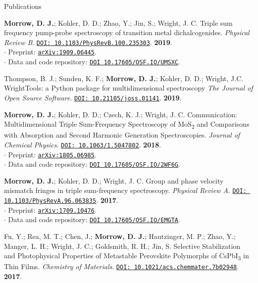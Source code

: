 \documentclass{resume} %
\begin{document}
\begin{rSection}{Publications}
\begin{etaremune}
\item  \textbf{Morrow, D. J.}; Kohler, D. D.; Zhao, Y.; Jin, S.; Wright, J. C. Triple sum frequency pump-probe spectroscopy of transition metal dichalcogenides. \emph{Physical Review B}. \href{https://journals.aps.org/prb/abstract/10.1103/PhysRevB.100.235303}{\texttt{DOI: 10.1103/PhysRevB.100.235303}}. \textbf{2019}.\\
$\cdot$ Preprint: \href{http://arxiv.org/abs/1909.06445}{\texttt{arXiv:1909.06445}}. \\
$\cdot$ Data and code repository: \href{https://osf.io/UMSXC/}{\texttt{DOI 10.17605/OSF.IO/UMSXC}}.

\item Thompson, B. J.; Sunden, K. F.; \textbf{Morrow, D. J.}; Kohler, D. D.; Wright, J.C. 
WrightTools: a Python package for multidimensional spectroscopy \emph{The Journal of Open Source Software}. 
\href{http://doi.org/10.21105/joss.01141}{\texttt{DOI: 10.21105/joss.01141}}. \textbf{2019}.
	
\item \textbf{Morrow, D. J.}; Kohler, D. D.; Czech, K. J.; Wright, J. C. 
Communication: Multidimensional Triple Sum-Frequency Spectroscopy of MoS\textsubscript{2} and Comparisons with Absorption and Second Harmonic Generation Spectroscopies. \emph{Journal of Chemical Physics}. \href{http://doi.org/10.1063/1.5047802}{\texttt{DOI: 10.1063/1.5047802}}. \textbf{2018}.\\
$\cdot$ Preprint: \href{http://arxiv.org/abs/1805.06985}{\texttt{arXiv:1805.06985}}. \\
$\cdot$ Data and code repository: \href{https://osf.io/2wf6g/}{\texttt{DOI 10.17605/OSF.IO/2WF6G}}.
	
\item \textbf{Morrow, D. J.}; Kohler, D. D.; Wright, J. C. Group and phase velocity mismatch fringes in triple sum-frequency spectroscopy. \emph{Physical Review A}. \href{https://journals.aps.org/pra/abstract/10.1103/PhysRevA.96.063835}{\texttt{DOI: 10.1103/PhysRevA.96.063835}}. \textbf{2017}.\\
$\cdot$ Preprint: \href{http://arxiv.org/abs/1709.10476}{\texttt{arXiv:1709.10476}}. \\
$\cdot$ Data and code repository: \href{https://osf.io/emgta/}{\texttt{DOI 10.17605/OSF.IO/EMGTA}}.

\item Fu, Y.; Rea, M. T.; Chen, J.; \textbf{Morrow, D. J.}; Hautzinger, M. P.; Zhao, Y.; Manger, L. H.; Wright, J. C.; Goldsmith, R. H.; Jin, S. Selective Stabilization and Photophysical Properties of
Metastable Perovskite Polymorphs of CsPbI\textsubscript{3} in Thin Films. \emph{Chemistry of Materials}. \href{http://pubs.acs.org/doi/10.1021/acs.chemmater.7b02948}{\texttt{DOI: 10.1021/acs.chemmater.7b02948}}. \textbf{2017}. 
 

\end{etaremune}
\end{rSection}
\end{document}
